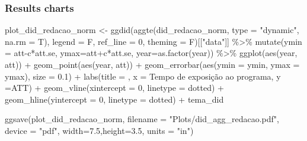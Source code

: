 \documentclass[
  letterpaper,
  DIV=11,
  numbers=noendperiod]{scrartcl}
\newenvironment{Shaded}{\begin{snugshade}}{\end{snugshade}}
\newcommand{\AttributeTok}[1]{\textcolor[rgb]{0.40,0.45,0.13}{#1}}
\newcommand{\DecValTok}[1]{\textcolor[rgb]{0.68,0.00,0.00}{#1}}
\newcommand{\FloatTok}[1]{\textcolor[rgb]{0.68,0.00,0.00}{#1}}
\newcommand{\FunctionTok}[1]{\textcolor[rgb]{0.28,0.35,0.67}{#1}}
\newcommand{\NormalTok}[1]{\textcolor[rgb]{0.00,0.23,0.31}{#1}}
\newcommand{\OtherTok}[1]{\textcolor[rgb]{0.00,0.23,0.31}{#1}}
\newcommand{\SpecialCharTok}[1]{\textcolor[rgb]{0.37,0.37,0.37}{#1}}
\newcommand{\StringTok}[1]{\textcolor[rgb]{0.13,0.47,0.30}{#1}}
\begin{document}
\subsubsection{Results charts}\label{results-charts}

\begin{Shaded}
\begin{Highlighting}[]
\NormalTok{plot\_did\_redacao\_norm }\OtherTok{\textless{}{-}}
\FunctionTok{ggdid}\NormalTok{(}\FunctionTok{aggte}\NormalTok{(did\_redacao\_norm, }\AttributeTok{type =} \StringTok{"dynamic"}\NormalTok{, }\AttributeTok{na.rm =}\NormalTok{ T),       }
      \AttributeTok{legend =}\NormalTok{ F, }\AttributeTok{ref\_line =} \DecValTok{0}\NormalTok{, }\AttributeTok{theming =}\NormalTok{ F)[[}\StringTok{"data"}\NormalTok{]] }\SpecialCharTok{\%\textgreater{}\%} 
    \FunctionTok{mutate}\NormalTok{(}\AttributeTok{ymin =}\NormalTok{ att}\SpecialCharTok{{-}}\NormalTok{c}\SpecialCharTok{*}\NormalTok{att.se, }\AttributeTok{ymax=}\NormalTok{att}\SpecialCharTok{+}\NormalTok{c}\SpecialCharTok{*}\NormalTok{att.se, }\AttributeTok{year=}\FunctionTok{as.factor}\NormalTok{(year)) }\SpecialCharTok{\%\textgreater{}\%} 
    \FunctionTok{ggplot}\NormalTok{(}\FunctionTok{aes}\NormalTok{(year, att)) }\SpecialCharTok{+}
    \FunctionTok{geom\_point}\NormalTok{(}\FunctionTok{aes}\NormalTok{(year, att)) }\SpecialCharTok{+}
    \FunctionTok{geom\_errorbar}\NormalTok{(}\FunctionTok{aes}\NormalTok{(}\AttributeTok{ymin =}\NormalTok{ ymin, }\AttributeTok{ymax =}\NormalTok{ ymax), }\AttributeTok{size =} \FloatTok{0.1}\NormalTok{) }\SpecialCharTok{+}
    \FunctionTok{labs}\NormalTok{(}\AttributeTok{title =} \StringTok{\textquotesingle{}\textquotesingle{}}\NormalTok{,}
         \AttributeTok{x =} \StringTok{\textquotesingle{}Tempo de exposição ao programa\textquotesingle{}}\NormalTok{,}
         \AttributeTok{y =}\StringTok{\textquotesingle{}ATT\textquotesingle{}}\NormalTok{) }\SpecialCharTok{+}
    \FunctionTok{geom\_vline}\NormalTok{(}\AttributeTok{xintercept =} \StringTok{\textquotesingle{}0\textquotesingle{}}\NormalTok{, }\AttributeTok{linetype =} \StringTok{\textquotesingle{}dotted\textquotesingle{}}\NormalTok{) }\SpecialCharTok{+}
    \FunctionTok{geom\_hline}\NormalTok{(}\AttributeTok{yintercept =} \DecValTok{0}\NormalTok{, }\AttributeTok{linetype =} \StringTok{\textquotesingle{}dotted\textquotesingle{}}\NormalTok{) }\SpecialCharTok{+}
\NormalTok{    tema\_did}

\FunctionTok{ggsave}\NormalTok{(plot\_did\_redacao\_norm, }
       \AttributeTok{filename =} \StringTok{"Plots/did\_agg\_redacao.pdf"}\NormalTok{,}
       \AttributeTok{device =} \StringTok{"pdf"}\NormalTok{,}
       \AttributeTok{width=}\FloatTok{7.5}\NormalTok{,}\AttributeTok{height=}\FloatTok{3.5}\NormalTok{, }\AttributeTok{units =} \StringTok{"in"}\NormalTok{)}


\end{Highlighting}
\end{Shaded}
\end{document}
